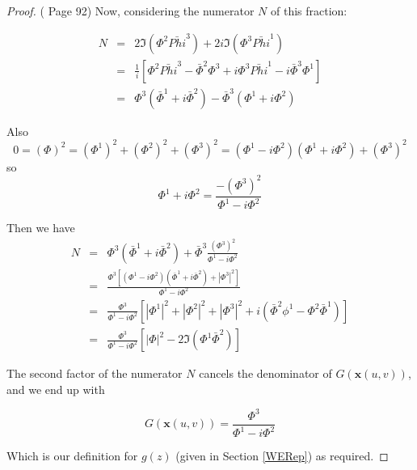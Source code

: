 \begin{proof}{(\cite{OPR} Page 92)}
Now, considering the numerator $N$ of this fraction:

\begin{eqnarray}
\nonumber
N &=& 2\Im(\Phi^2\bar{Phi}^3) + 2i\Im(\Phi^3\bar{Phi}^1) \\
\nonumber
&=& \frac{1}{i}[\Phi^2\bar{Phi}^3-\bar{\Phi}^2\Phi^3+i\Phi^3\bar{Phi}^1-i\bar{\Phi}^3\Phi^1] \\
\nonumber
&=& \Phi^3(\bar{\Phi}^1+i\bar{\Phi}^2)-\bar{\Phi}^3(\Phi^1+i\Phi^2)
\end{eqnarray}

Also
\begin{displaymath}
0 = (\Phi)^2 =(\Phi^1)^2+(\Phi^2)^2+(\Phi^3)^2 = (\Phi^1-i\Phi^2)(\Phi^1+i\Phi^2)+(\Phi^3)^2
\end{displaymath}
so
\begin{displaymath}
\Phi^1 + i \Phi^2 =\frac{-(\Phi^3)^2}{\Phi^1-i\Phi^2}
\end{displaymath}

Then we have
\begin{eqnarray}
\nonumber
N &=& \Phi^3(\bar{\Phi}^1+i\bar{\Phi}^2)+\bar{\Phi}^3\frac{(\Phi^3)^2}{\Phi^1-i\Phi^2} \\
\nonumber
&=&\frac{\Phi^3[(\Phi^1-i\Phi^2)(\bar{\Phi}^1+i\bar{\Phi}^2)+|\Phi^3|^2]}{\Phi^1-i\Phi^2} \\
\nonumber
&=& \frac{\Phi^3}{\Phi^1-i\Phi^2}[|\Phi^1|^2+|\Phi^2|^2+|\Phi^3|^2 + i(\bar{\Phi}^2\phi^1-\Phi^2\bar{\Phi}^1)] \\
\nonumber
&=& \frac{\Phi^3}{\Phi^1-i\Phi^2} [|\Phi|^2 - 2\Im(\Phi^1\bar{\Phi}^2)]
\end{eqnarray}

The second factor of the numerator $N$ cancels the denominator of $G(\mathbf x(u,v))$, and we end up with

\begin{displaymath}
G(\mathbf x(u,v))=\frac{\Phi^3}{\Phi^1-i\Phi^2}
\end{displaymath}

Which is our definition for $g(z)$ (given in Section \ref{WERep}) as required.
\end{proof}